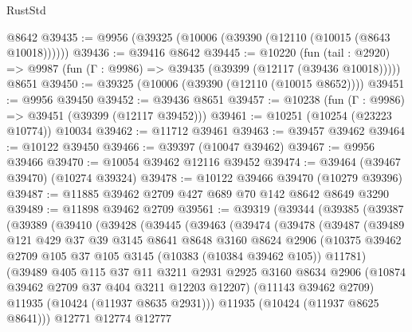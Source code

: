 \begin{lexlean}{RustStd}
\begin{coremodule}
    @8642
@39435 := @9956 (@39325 (@10006 (@39390 (@12110 (@10015 (@8643 @10018))))))
@39436 := @39416 @8642
@39445 := @10220
    (fun (tail : @2920) => @9987 (fun (Γ : @9986) => @39435 (@39399 (@12117 (@39436 @10018)))))
    @8651
@39450 := @39325 (@10006 (@39390 (@12110 (@10015 @8652))))
@39451 := @9956 @39450
@39452 := @39436 @8651
@39457 := @10238 (fun (Γ : @9986) => @39451 (@39399 (@12117 @39452)))
@39461 := @10251 (@10254 (@23223 @10774)) @10034
@39462 := @11712 @39461
@39463 := @39457 @39462
@39464 := @10122 @39450
@39466 := @39397 (@10047 @39462)
@39467 := @9956 @39466
@39470 := @10054 @39462 @12116 @39452
@39474 := @39464 (@39467 @39470) (@10274 @39324)
@39478 := @10122 @39466 @39470 (@10279 @39396)
@39487 := @11885 @39462 @2709 @427 @689 @70 @142 @8642 @8649 @3290
@39489 := @11898 @39462 @2709
@39561 := @39319
    (@39344
      (@39385
        (@39387
          (@39389
            (@39410
              (@39428
                (@39445
                  (@39463
                    (@39474
                      (@39478
                        (@39487
                          (@39489
                            @121
                            @429
                            @37
                            @39
                            @3145
                            @8641
                            @8648
                            @3160
                            @8624
                            @2906
                            (@10375
                              @39462
                              @2709
                              @105
                              @37
                              @105
                              @3145
                              (@10383 (@10384 @39462 @105))
                              @11781)
                            (@39489
                              @405
                              @115
                              @37
                              @11
                              @3211
                              @2931
                              @2925
                              @3160
                              @8634
                              @2906
                              (@10874 @39462 @2709 @37 @404 @3211 @12203 @12207)
                              (@11143 @39462 @2709)
                              @11935
                              (@10424 (@11937 @8635 @2931)))
                            @11935
                            (@10424 (@11937 @8625 @8641)))
                          @12771
                          @12774
                          @12777

\end{coremodule}
\end{lexlean}
